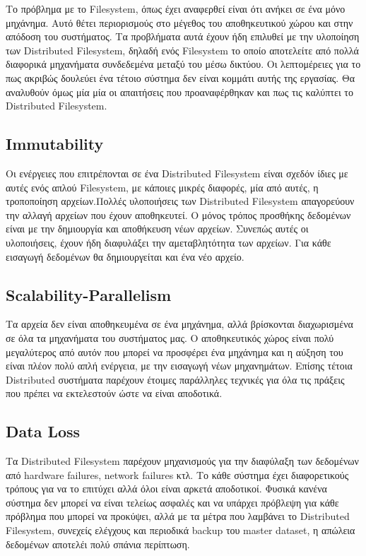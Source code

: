 Το πρόβλημα με το Filesystem, όπως έχει αναφερθεί είναι ότι ανήκει σε ένα μόνο μηχάνημα. Αυτό θέτει περιορισμούς στο μέγεθος του αποθηκευτικού χώρου και στην απόδοση του συστήματος. Τα προβλήματα αυτά έχουν ήδη επιλυθεί με την υλοποίηση των Distributed Filesystem, δηλαδή ενός Filesystem το οποίο αποτελείτε από πολλά διαφορικά μηχανήματα συνδεδεμένα μεταξύ του μέσω δικτύου. Οι λεπτομέρειες για το πως ακριβώς δουλεύει ένα τέτοιο σύστημα δεν είναι κομμάτι αυτής της εργασίας. Θα αναλυθούν όμως μία μία οι απαιτήσεις που προαναφέρθηκαν και πως τις καλύπτει το Distributed Filesystem.
\subsection{Immutability}
Οι ενέργειες που επιτρέπονται σε ένα Distributed Filesystem είναι σχεδόν ίδιες με αυτές ενός απλού Filesystem, με κάποιες μικρές διαφορές, μία από αυτές, η τροποποίηση αρχείων.Πολλές υλοποιήσεις των Distributed Filesystem απαγορεύουν την αλλαγή αρχείων που έχουν αποθηκευτεί. Ο μόνος τρόπος προσθήκης δεδομένων είναι με την δημιουργία και αποθήκευση νέων αρχείων. Συνεπώς αυτές οι υλοποιήσεις, έχουν ήδη διαφυλάξει την αμεταβλητότητα των αρχείων. Για κάθε εισαγωγή δεδομένων θα δημιουργείται και ένα νέο αρχείο.
\subsection{Scalability-Parallelism}
Τα αρχεία δεν είναι αποθηκευμένα σε ένα μηχάνημα, αλλά βρίσκονται διαχωρισμένα σε όλα τα μηχανήματα του συστήματος μας. Ο αποθηκευτικός χώρος είναι πολύ μεγαλύτερος από αυτόν που μπορεί να προσφέρει ένα μηχάνημα και η αύξηση του είναι πλέον πολύ απλή ενέργεια, με την εισαγωγή νέων μηχανημάτων. Επίσης τέτοια Distributed συστήματα παρέχουν έτοιμες παράλληλες τεχνικές για όλα τις πράξεις που πρέπει να εκτελεστούν ώστε να είναι αποδοτικά.
\subsection{Data Loss}
Τα Distributed Filesystem παρέχουν μηχανισμούς για την διαφύλαξη των δεδομένων από hardware failures, network failures κτλ. Το κάθε σύστημα έχει διαφορετικούς τρόπους για να το επιτύχει αλλά όλοι είναι αρκετά αποδοτικοί. Φυσικά κανένα σύστημα δεν μπορεί να είναι τελείως ασφαλές και να υπάρχει πρόβλεψη για κάθε πρόβλημα που μπορεί να προκύψει, αλλά με τα μέτρα που λαμβάνει το Distributed Filesystem, συνεχείς ελέγχους και περιοδικά backup του master dataset, η απώλεια δεδομένων αποτελέι πολύ σπάνια περίπτωση.
